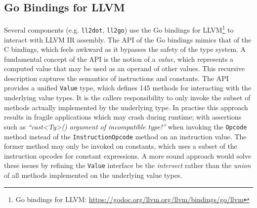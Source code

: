 
\subsection{Go Bindings for LLVM}
\label{sec:go_bindings_for_llvm}



Several components (e.g. \texttt{ll2dot}, \texttt{ll2go}) use the Go bindings for LLVM\footnote{Go bindings for LLVM: \url{https://godoc.org/llvm.org/llvm/bindings/go/llvm}} to interact with LLVM IR assembly. The API of the Go bindings mimics that of the C bindings, which feels awkward as it bypasses the safety of the type system. A fundamental concept of the API is the notion of a \textit{value}, which represents a computed value that may be used as an operand of other values. This recursive description captures the semantics of instructions and constants. The API provides a unified \texttt{Value} type, which defines 145 methods for interacting with the underlying value types. It is the callers responsibility to only invoke the subset of methods actually implemented by the underlying type. In practise this approach results in fragile applications which may crash during runtime; with assertions such as \textit{``cast<Ty>() argument of incompatible type!''} when invoking the \texttt{Opcode} method instead of the \texttt{InstructionOpcode} method on an instruction value. The former method may only be invoked on constants, which uses a subset of the instruction opcodes for constant expressions. A more sound approach would solve these issues by refining the \texttt{Value} interface be the \textit{intersect} rather than the \textit{union} of all methods implemented on the underlying value types.

